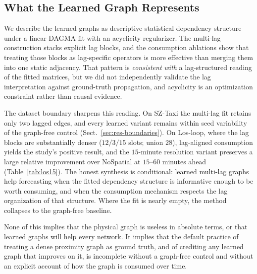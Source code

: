 \subsection{What the Learned Graph Represents}\label{sec:disc-interpretation}

We describe the learned graphs as descriptive statistical dependency
structure under a linear DAGMA fit with an acyclicity regularizer. The
multi-lag construction stacks explicit lag blocks, and the consumption
ablations show that treating those blocks as lag-specific operators is more
effective than merging them into one static adjacency. That pattern is
\emph{consistent with} a lag-structured reading of the fitted matrices, but
we did not independently validate the lag interpretation against ground-truth
propagation, and acyclicity is an optimization constraint rather than causal
evidence.

The dataset boundary sharpens this reading. On SZ-Taxi the multi-lag fit
retains only two lagged edges, and every learned variant remains within seed
variability of the graph-free control (Sect.~\ref{sec:res-boundaries}). On
Los-loop, where the lag blocks are substantially denser
($12/3/15$ slots; union $28$), lag-aligned consumption yields the study's
positive result, and the $15$-minute resolution variant preserves a large
relative improvement over NoSpatial at $15$--$60$ minutes ahead
(Table~\ref{tab:los15}). The honest synthesis is conditional: learned
multi-lag graphs help forecasting when the fitted dependency structure is
informative enough to be worth consuming, and when the consumption mechanism
respects the lag organization of that structure. Where the fit is nearly
empty, the method collapses to the graph-free baseline.

None of this implies that the physical graph is useless in absolute terms,
or that learned graphs will help every network. It implies that the default
practice of treating a dense proximity graph as ground truth, and of
crediting any learned graph that improves on it, is incomplete without a
graph-free control and without an explicit account of how the graph is
consumed over time.
